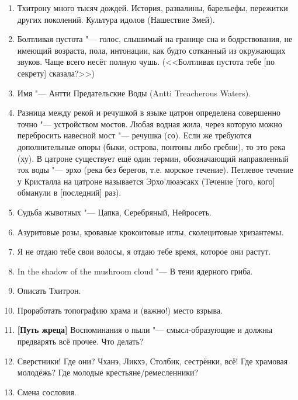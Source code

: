 \begin{enumerate}
\item Тхитрону много тысяч дождей.
История, развалины, барельефы, пережитки других поколений.
Культура идолов (Нашествие Змей).

\item Болтливая пустота "--- голос, слышимый на границе сна и бодрствования, не имеющий возраста, пола, интонации, как будто сотканный из окружающих звуков.
Чаще всего несёт полную чушь.
(<<Болтливая пустота тебе [по секрету] сказала?>>)

\item Имя "--- Антти Предательские Воды (Antti Treacherous Waters).

\item Разница между рекой и речушкой в языке цатрон определена совершенно точно "--- устройством мостов.
Любая водная жила, через которую можно перебросить навесной мост "--- речушка (со).
Если же требуются дополнительные опоры (быки, острова, понтоны либо гребни), то это река (ху).
В цатроне существует ещё один термин, обозначающий направленный ток воды "--- эрхо (река без берегов, т.е. морское течение).
Петлевое течение у Кристалла на цатроне называется Эрхо'люаэсакх (Течение [того, кого] обманули в [последний] раз).

\item Судьба жывотных "--- Цапка, Серебряный, Нейросеть.

\item Азуритовые розы, кровавые крокоитовые иглы, сколецитовые хризантемы.

\item Я не отдаю тебе свои волосы, я отдаю тебе время, которое они растут.

\item In the shadow of the mushroom cloud "--- В тени ядерного гриба.

\item Описать Тхитрон.

\item Проработать топографию храма и (важно!) место взрыва.

\item \textbf{[Путь жреца]} Воспоминания о пыли "--- смысл-образующие и должны предварять всё прочее.
Что делать?

\item Сверстники!
Где они?
Чханэ, Ликхэ, Столбик, сестрёнки, всё!
Где храмовая молодёжь?
Где молодые крестьяне/ремесленники?

\item Смена сословия.


\end{enumerate}
